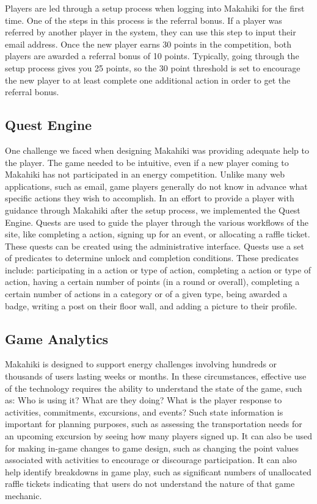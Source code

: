 Players are led through a setup process when logging into Makahiki for the first time. One of the steps in this process is the referral bonus. If a player was referred by another player in the system, they can use this step to input their email address. Once the new player earns 30 points in the competition, both players are awarded a referral bonus of 10 points. Typically, going through the setup process gives you 25 points, so the 30 point threshold is set to encourage the new player to at least complete one additional action in order to get the referral bonus.

\subsection{Quest Engine}

One challenge we faced when designing Makahiki was providing adequate help to the player. The game needed to be intuitive, even if a new player coming to Makahiki has not participated in an energy competition. Unlike many web applications, such as email, game players generally do not know in advance what specific actions they wish to accomplish. In an effort to provide a player with guidance through Makahiki after the setup process, we implemented the Quest Engine. Quests are used to guide the player through the various workflows of the site, like completing a action, signing up for an event, or allocating a raffle ticket. These quests can be created using the administrative interface. Quests use a set of predicates to determine unlock and completion conditions. These predicates include: participating in a action or type of action, completing a action or type of action, having a certain number of points (in a round or overall), completing a certain number of actions in a category or of a given type, being awarded a badge, writing a post on their floor wall, and adding a picture to their profile.

\subsection{Game Analytics}

Makahiki is designed to support energy challenges involving hundreds or thousands of users lasting weeks or months.  In these circumstances, effective use of the technology requires the ability to understand the state of the game, such as: Who is using it? What are they doing? What is the player response to activities, commitments, excursions, and events?   Such state information is important for planning purposes, such as assessing the transportation needs for an upcoming excursion by seeing how many players signed up.   It can also be used for making in-game changes to game design, such as changing the point values associated with activities to encourage or discourage participation.  It can also help identify breakdowns in game play, such as significant numbers of unallocated raffle tickets indicating that users do not understand the nature of that game mechanic.  

